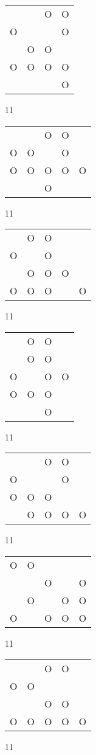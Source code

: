 \begin{tabular}{|m{0.2cm}m{0.2cm}m{0.2cm}m{0.2cm}|}\hline
 & &O&O\\
O& & &O\\
 &O&O& \\
O&O&O&O\\
 & & &O\\
\hline\end{tabular}11
\begin{tabular}{|m{0.2cm}m{0.2cm}m{0.2cm}m{0.2cm}m{0.2cm}|}\hline
 & &O&O& \\
O&O& &O& \\
O&O&O&O&O\\
 & &O& & \\
\hline\end{tabular}11
\begin{tabular}{|m{0.2cm}m{0.2cm}m{0.2cm}m{0.2cm}m{0.2cm}|}\hline
 &O&O& & \\
O& &O& & \\
 &O&O&O& \\
O&O&O& &O\\
\hline\end{tabular}11
\begin{tabular}{|m{0.2cm}m{0.2cm}m{0.2cm}m{0.2cm}|}\hline
 &O&O& \\
 &O&O& \\
O& &O&O\\
O&O&O& \\
 & &O& \\
\hline\end{tabular}11
\begin{tabular}{|m{0.2cm}m{0.2cm}m{0.2cm}m{0.2cm}m{0.2cm}|}\hline
 & &O&O& \\
O& & &O& \\
O&O&O& & \\
 &O&O&O&O\\
\hline\end{tabular}11
\begin{tabular}{|m{0.2cm}m{0.2cm}m{0.2cm}m{0.2cm}m{0.2cm}|}\hline
O&O& & & \\
 & &O& &O\\
 &O& &O&O\\
O& &O&O&O\\
\hline\end{tabular}11
\begin{tabular}{|m{0.2cm}m{0.2cm}m{0.2cm}m{0.2cm}m{0.2cm}|}\hline
 & &O&O& \\
O&O& & & \\
 & &O&O& \\
O&O&O&O&O\\
\hline\end{tabular}11
